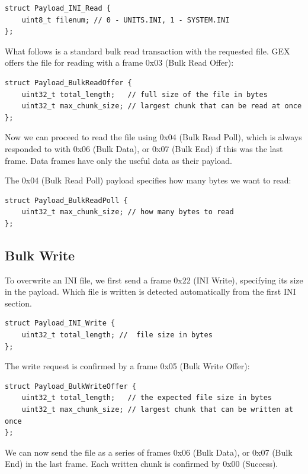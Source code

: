\begin{verbatim}
struct Payload_INI_Read {
    uint8_t filenum; // 0 - UNITS.INI, 1 - SYSTEM.INI
};
\end{verbatim}

What follows is a standard bulk read transaction with the requested file.
GEX offers the file for reading with a frame 0x03 (Bulk Read Offer):

\begin{verbatim}
struct Payload_BulkReadOffer {
    uint32_t total_length;   // full size of the file in bytes
    uint32_t max_chunk_size; // largest chunk that can be read at once
};
\end{verbatim}

Now we can proceed to read the file using 0x04 (Bulk Read Poll), which is always responded to with 0x06 (Bulk Data), or 0x07 (Bulk End) if this was the last frame. Data frames have only the useful data as their payload.

The 0x04 (Bulk Read Poll) payload specifies how many bytes we want to read:

\begin{verbatim}
struct Payload_BulkReadPoll {
    uint32_t max_chunk_size; // how many bytes to read
};
\end{verbatim}

\subsection{Bulk Write}

To overwrite an INI file, we first send a frame 0x22 (INI Write), specifying its size in the payload. Which file is written is detected automatically from the first INI section.

\begin{verbatim}
struct Payload_INI_Write {
    uint32_t total_length; //  file size in bytes
};
\end{verbatim}

The write request is confirmed by a frame 0x05 (Bulk Write Offer):

\begin{verbatim}
struct Payload_BulkWriteOffer {
    uint32_t total_length;   // the expected file size in bytes
    uint32_t max_chunk_size; // largest chunk that can be written at once
};
\end{verbatim}

We can now send the file as a series of frames 0x06 (Bulk Data), or 0x07 (Bulk End) in the last frame. Each written chunk is confirmed by 0x00 (Success).

